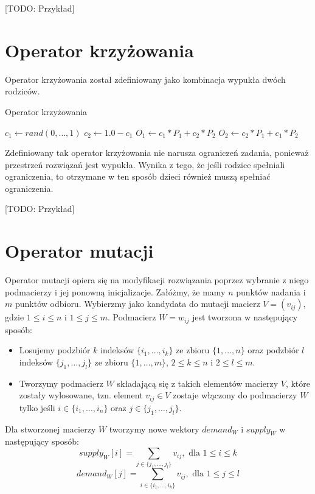[TODO: Przykład]


\section{Operator krzyżowania}
Operator krzyżowania został zdefiniowany jako kombinacja wypukła dwóch rodziców.

\begin{pseudokod}
    \caption{Operator krzyżowania}
    $c_1 \gets rand(0,\dots,1)$
    $c_2 \gets 1.0 - c_1$\;
    $O_1 \gets c_1 * P_1 + c_2 * P_2$\;
    $O_2 \gets c_2 * P_1 + c_1 * P_2$\;
    \;
\end{pseudokod}

Zdefiniowany tak operator krzyżowania nie narusza ograniczeń zadania, ponieważ przestrzeń rozwiązań jest wypukła. Wynika z tego, że jeśli 
rodzice spełniali ograniczenia, to otrzymane w ten sposób dzieci również muszą spełniać ograniczenia.

[TODO: Przykład]

\section{Operator mutacji}
Operator mutacji opiera się na modyfikacji rozwiązania poprzez wybranie z niego podmacierzy i jej ponowną inicjalizacje. Załóżmy, że 
mamy $n$ punktów nadania i $m$ punktów odbioru. Wybierzmy jako kandydata do mutacji macierz $V = (v_{ij})$, gdzie $1 \le i \le n$ i 
$1 \le j \le m$. Podmacierz $W = w_{ij}$ jest tworzona w następujący sposób:

\begin{itemize}
    \item Losujemy podzbiór $k$ indeksów $\{i_1, \dots, i_k\}$ ze zbioru $\{1, \dots, n\}$ oraz podzbiór $l$ indeksów $\{j_1, \dots, j_l\}$ 
    ze zbioru $\{1, \dots, m\}$, $2 \le k \le n$ i $2 \le l \le m$.
    \item Tworzymy podmacierz $W$ składającą się z takich elementów macierzy $V$, które zostały wylosowane, tzn. element $v_{ij} \in V$ 
    zostaje włączony do podmacierzy $W$ tylko jeśli $i \in \{i_1, \dots, i_n\}$ oraz $j \in \{j_1, \dots, j_l\}$.
\end{itemize}

Dla stworzonej macierzy $W$ tworzymy nowe wektory $demand_W$ i $supply_W$ w następujący sposób:
$$supply_W[i] = \sum_{j \in \{j_1, \dots, j_l\}} v_{ij}, \text{ dla } 1 \le i \le k$$
$$demand_W[j] = \sum_{i \in \{i_1, \dots, i_k\}} v_{ij}, \text{ dla } 1 \le j \le l$$

